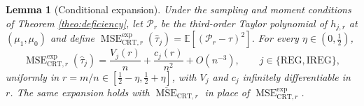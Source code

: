 \documentclass{article}
\newcommand{\EEE}{\mathbb{E}}
\newcommand{\htau}{\hat{\tau}}
\DeclareMathOperator{\MSE}{MSE}
\newcommand{\CRT}{\mathrm{CRT}}
\newcommand{\IREG}{\mathrm{IREG}}
\newcommand{\REG}{\mathrm{REG}}
\newcommand{\MSEexp}{\MSE^{\mathrm{exp}}}
\theoremstyle{plain}
\newtheorem{lemm}[prop]{Lemma}
\theoremstyle{definition}
\theoremstyle{remark}
\begin{document}
\begin{lemm}[Conditional expansion]
\label{lemm:conditional}
Under the sampling and moment conditions of Theorem \ref{theo:deficiency}, let $\mathcal P_r$ be the third-order Taylor polynomial of $h_{j,r}$
at $(\mu_1,\mu_0)$ and define
$\MSEexp_{\CRT,r}(\htau_j)=\EEE[(\mathcal P_r-\tau)^2]$. For every
$\eta\in(0,\frac12)$,
\begin{equation}
\label{eq:conditional_expansion}
\MSEexp_{\CRT,r}(\hat{\tau}_{j})
=
\frac{V_j(r)}{n}+\frac{c_j(r)}{n^2}+O(n^{-3}),
\qquad
j\in\{\REG,\IREG\},
\end{equation}
uniformly in $r=m/n\in[\frac12-\eta,\frac12+\eta]$, with $V_j$ and $c_j$ infinitely differentiable in $r$. The same expansion holds with $\overline{\operatorname{MSE}}_{\CRT,r}$ in place of $\MSEexp_{\CRT,r}$.
\end{lemm}
\end{document}
